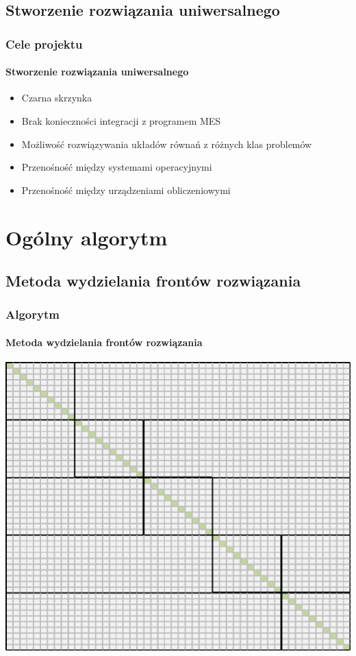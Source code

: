 \documentclass{beamer}
\begin{document}
\subsection{Stworzenie rozwiązania uniwersalnego}
  \begin{frame}
    \frametitle{Cele projektu}
    \framesubtitle{Stworzenie rozwiązania uniwersalnego}
	\begin{itemize}[<+->]
		\item Czarna skrzynka
		\item Brak konieczności integracji z programem MES
		\item Możliwość rozwiązywania układów równań z różnych klas problemów
		\item Przenośność między systemami operacyjnymi
		\item Przenośność między urządzeniami obliczeniowymi
	\end{itemize}
  \end{frame}

\section{Ogólny algorytm}

\subsection{Metoda wydzielania frontów rozwiązania}
\begin{frame}
\frametitle{Algorytm}
\framesubtitle{Metoda wydzielania frontów rozwiązania}
\hfill\includegraphics[scale=0.35]{fronty.png}\hspace*{\fill}
\end{frame}
\end{document}
